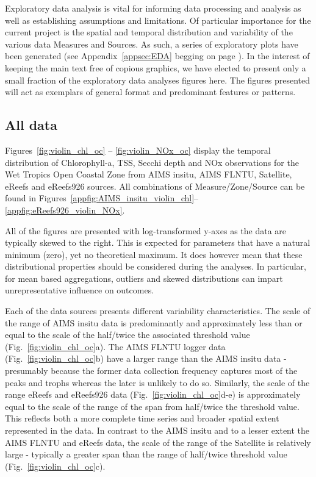 
Exploratory data analysis is vital for informing data processing and analysis as well as
establishing assumptions and limitations.  Of particular importance for the current project is the
spatial and temporal distribution and variability of the various data Measures and Sources.  As
such, a series of exploratory plots have been generated (see Appendix~\ref{appsec:EDA} begging on
page \pageref{appsec:EDA}).  In the interest of keeping the main text free of copious graphics, we
have elected to present only a small fraction of the exploratory data analyses figures here.  The
figures presented will act as exemplars of general format and predominant features or patterns.

\subsection{All data}

Figures~\ref{fig:violin_chl_oc} -- \ref{fig:violin_NOx_oc} display the temporal distribution of
Chlorophyll-a, TSS, Secchi depth and NOx observations for the Wet Tropics Open Coastal Zone from
AIMS insitu, AIMS FLNTU, Satellite, eReefs and eReefs926 sources. All combinations of
Measure/Zone/Source can be found in
Figures~\ref{appfig:AIMS_insitu_violin_chl}--\ref{appfig:eReefs926_violin_NOx}.

All of the figures are presented with log-transformed y-axes as the data are typically skewed to the
right.  This is expected for parameters that have a natural minimum (zero), yet no theoretical
maximum.  It does however mean that these distributional properties should be considered during the
analyses.  In particular, for mean based aggregations, outliers and skewed distributions can impart
unrepresentative influence on outcomes.

Each of the data sources presents different variability characteristics.  The scale of the range of
AIMS insitu data is predominantly and approximately less than or equal to the scale of the
half/twice the associated threshold value (Fig.~\ref{fig:violin_chl_oc}a).  The AIMS FLNTU logger
data (Fig.~\ref{fig:violin_chl_oc}b) have a larger range than the AIMS insitu data - presumably
because the former data collection frequency captures most of the peaks and trophs whereas the later
is unlikely to do so.  Similarly, the scale of the range eReefs and eReefs926 data
(Fig.~\ref{fig:violin_chl_oc}d-e) is approximately equal to the scale of the range of the span from
half/twice the threshold value.  This reflects both a more complete time series and broader spatial
extent represented in the data.  In contrast to the AIMS insitu and to a lesser extent the AIMS
FLNTU and eReefs data, the scale of the range of the Satellite is relatively large - typically a
greater span than the range of half/twice threshold value (Fig.~\ref{fig:violin_chl_oc}c).


